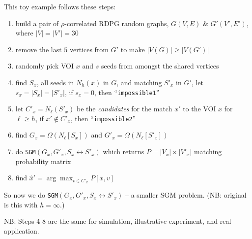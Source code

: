 \documentclass[
]{article}
\providecommand{\tightlist}{%
  \setlength{\itemsep}{0pt}\setlength{\parskip}{0pt}}
\begin{document}
This toy example follows these steps:

\begin{enumerate}
\def\labelenumi{\arabic{enumi}.}
\tightlist
\item
  build a pair of \(\rho\)-correlated RDPG random graphs, \(G(V,E)\) \&
  \(G'(V',E')\), where \(|V|=|V'|=30\)
\item
  remove the last \(5\) vertices from \(G'\) to make
  \(|V(G)| \geq |V(G')|\)
\item
  randomly pick VOI \(x\) and \(s\) seeds from amongst the shared
  vertices
\item
  find \(S_x\), all seeds in \(N_h(x)\) in \(G\), and matching \(S'_x\)
  in \(G'\), let \(s_x = |S_x| = |S'_x|\), if \(s_x=0\), then
  ``\texttt{impossible1}''
\item
  let \(C'_x = N_\ell(S'_x)\) be the \emph{candidates} for the match
  \(x'\) to the VOI \(x\) for \(\ell\geq h\), if \(x' \notin C'_x\),
  then ``\texttt{impossible2}''
\item
  find \(G_x = \Omega(N_\ell[S_x])\) and \(G'_x = \Omega(N_\ell[S'_x])\)
\item
  do \texttt{SGM}\((G_x, G'_x, S_x \leftrightarrow S'_x)\) which returns
  \(P=|V_x| \times |V'_x|\) matching probability matrix
\item
  find \(\hat{x}' = \arg\max_{v \in {C'_x}} P[x,v]\)
\end{enumerate}

So now we do \texttt{SGM}\((G_x,G'_x,S_x \leftrightarrow S'_x)\) -- a
smaller SGM problem. (NB: original is this with \(h=\infty\).)

NB: Steps 4-8 are the same for simulation, illustrative experiment, and
real application.
\end{document}
